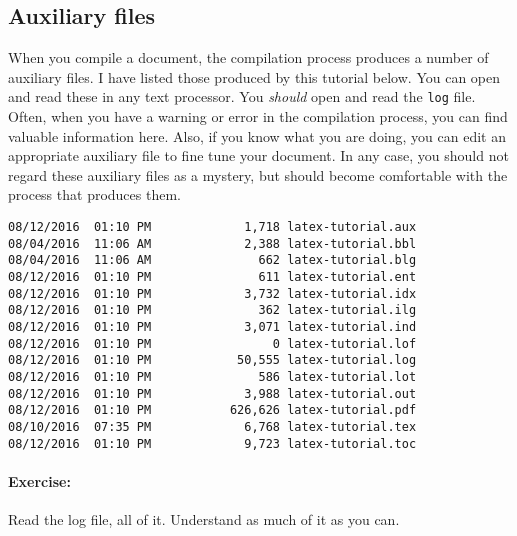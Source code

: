         \subsection{Auxiliary files}
        \label{Auxiliary files}
        
        When you compile a \Lx{} document, the compilation process produces a number of auxiliary files. I have listed those produced by this tutorial below. You can open and read these in any text processor. You \textit{should} open and read the \texttt{log} file. Often, when you have a warning or error in the compilation process, you can find valuable information here. Also, if you know what you are doing, you can edit an appropriate auxiliary file to fine tune your document. In any case, you should not regard these auxiliary files as a mystery, but should become comfortable with the process that produces them.

        \begin{verbatim}
08/12/2016  01:10 PM             1,718 latex-tutorial.aux
08/04/2016  11:06 AM             2,388 latex-tutorial.bbl
08/04/2016  11:06 AM               662 latex-tutorial.blg
08/12/2016  01:10 PM               611 latex-tutorial.ent
08/12/2016  01:10 PM             3,732 latex-tutorial.idx
08/12/2016  01:10 PM               362 latex-tutorial.ilg
08/12/2016  01:10 PM             3,071 latex-tutorial.ind
08/12/2016  01:10 PM                 0 latex-tutorial.lof
08/12/2016  01:10 PM            50,555 latex-tutorial.log
08/12/2016  01:10 PM               586 latex-tutorial.lot
08/12/2016  01:10 PM             3,988 latex-tutorial.out
08/12/2016  01:10 PM           626,626 latex-tutorial.pdf
08/10/2016  07:35 PM             6,768 latex-tutorial.tex
08/12/2016  01:10 PM             9,723 latex-tutorial.toc
        \end{verbatim}

        \paragraph{Exercise:} Read the log file, all of it. Understand as much of it as you can.
